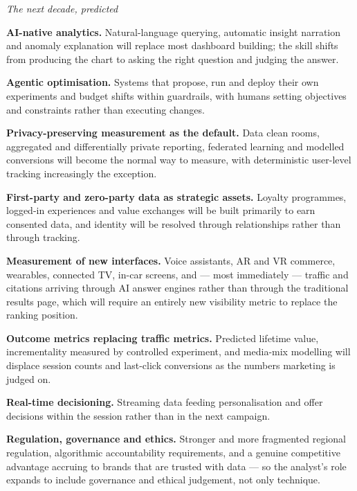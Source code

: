\begin{qlist}
\textit{The next decade, predicted}
\begin{apts}\setcounter{enumi}{8}
\item \textbf{AI-native analytics.} Natural-language querying, automatic
      insight narration and anomaly explanation will replace most dashboard
      building; the skill shifts from producing the chart to asking the right
      question and judging the answer.
\item \textbf{Agentic optimisation.} Systems that propose, run and deploy their
      own experiments and budget shifts within guardrails, with humans setting
      objectives and constraints rather than executing changes.
\item \textbf{Privacy-preserving measurement as the default.} Data clean rooms,
      aggregated and differentially private reporting, federated learning and
      modelled conversions will become the normal way to measure, with
      deterministic user-level tracking increasingly the exception.
\item \textbf{First-party and zero-party data as strategic assets.} Loyalty
      programmes, logged-in experiences and value exchanges will be built
      primarily to earn consented data, and identity will be resolved through
      relationships rather than through tracking.
\item \textbf{Measurement of new interfaces.} Voice assistants, AR and VR
      commerce, wearables, connected TV, in-car screens, and --- most
      immediately --- traffic and citations arriving through AI answer engines
      rather than through the traditional results page, which will require an
      entirely new visibility metric to replace the ranking position.
\item \textbf{Outcome metrics replacing traffic metrics.} Predicted lifetime
      value, incrementality measured by controlled experiment, and media-mix
      modelling will displace session counts and last-click conversions as the
      numbers marketing is judged on.
\item \textbf{Real-time decisioning.} Streaming data feeding personalisation
      and offer decisions within the session rather than in the next campaign.
\item \textbf{Regulation, governance and ethics.} Stronger and more fragmented
      regional regulation, algorithmic accountability requirements, and a
      genuine competitive advantage accruing to brands that are trusted with
      data --- so the analyst's role expands to include governance and ethical
      judgement, not only technique.
\end{apts}


\end{qlist}
